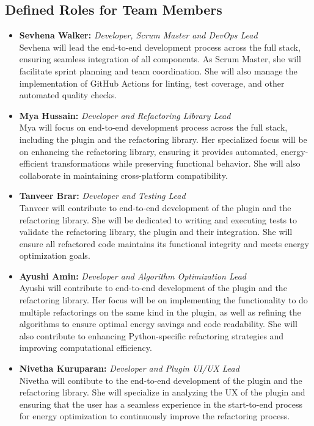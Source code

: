 \documentclass{article}
\begin{document}
\subsection*{Defined Roles for Team Members}
\begin{itemize}
    \item \textbf{Sevhena Walker:} \textit{Developer, Scrum Master and DevOps Lead} \\
    Sevhena will lead the end-to-end development process across the full stack, ensuring seamless integration of all components. As Scrum Master, she will facilitate sprint planning and team coordination. She will also manage the implementation of GitHub Actions for linting, test coverage, and other automated quality checks.
    
    \item \textbf{Mya Hussain:} \textit{Developer and Refactoring Library Lead} \\
    Mya will focus on end-to-end development process across the full stack, including the plugin and the refactoring library. Her specialized focus will be on enhancing the refactoring library, ensuring it provides automated, energy-efficient transformations 
    while preserving functional behavior. She will also collaborate in 
    maintaining cross-platform compatibility.

    \item \textbf{Tanveer Brar:} \textit{Developer and Testing Lead} \\
    Tanveer will contribute to end-to-end development of the plugin and the refactoring library. She will be dedicated to writing and executing tests to validate the refactoring library, the plugin and their integration. She will ensure all refactored code maintains its functional integrity and meets energy optimization goals. 

    \item \textbf{Ayushi Amin:} \textit{Developer and Algorithm Optimization Lead} \\
    Ayushi will contribute to end-to-end development of the plugin and the refactoring library. Her focus will be on implementing the functionality to do multiple refactorings on the same kind in the plugin, as well as refining the algorithms to ensure optimal energy savings and code readability. She will also contribute to enhancing Python-specific refactoring strategies and improving computational efficiency.

    \item \textbf{Nivetha Kuruparan:} \textit{Developer and Plugin UI/UX Lead} \\
    Nivetha will contibute to the end-to-end development of the plugin and the refactoring library. She will specialize in analyzing the UX of the plugin and ensuring that the user has a seamless experience in the start-to-end process for energy optimization to continuously improve the refactoring process.
\end{itemize}
\end{document}
